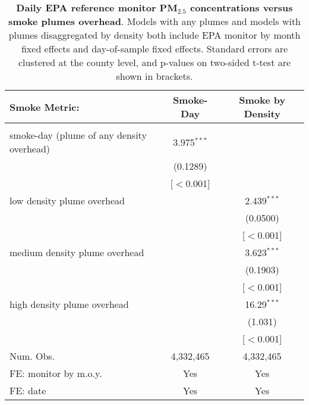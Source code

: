 \begin{table}[h]
\centering
\caption{\textbf{Daily EPA reference monitor PM$_{2.5}$ concentrations versus smoke plumes overhead}. Models with any plumes and models with plumes disaggregated by density both include EPA monitor by month fixed effects and day-of-sample fixed effects. Standard errors are clustered at the county level, and p-values on two-sided t-test are shown in brackets.}

\begin{tabular}{lcc}
\textbf{Smoke Metric}:
&Smoke-Day &Smoke by Density\\

\midrule &   &  \\
smoke-day (plume of any density overhead)&3.975$^{***}$ &   \\
  &(0.1289) &   \\
 & [$<$0.001] &  \\
low density plume overhead&   & 2.439$^{***}$\\
  &   & (0.0500)\\
 & & [$<$0.001]   \\
medium density plume overhead&   & 3.623$^{***}$\\
  &   & (0.1903)\\
 & & [$<$0.001]   \\
high density plume overhead&   & 16.29$^{***}$\\
  &   & (1.031)\\
 & & [$<$0.001]   \\
\midrule Num. Obs.& 4,332,465  &  4,332,465\\
FE: monitor by m.o.y. & Yes & Yes\\
FE: date & Yes & Yes\\
\midrule
\end{tabular}
\end{table}
